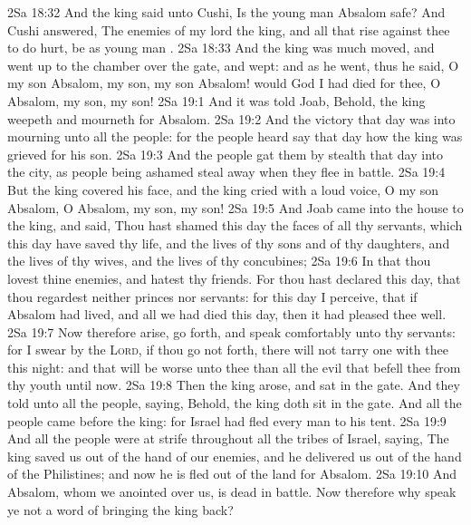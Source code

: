 \vs 2Sa 18:32 And the king said unto Cushi, Is the young man Absalom safe? And Cushi answered, The enemies of my lord the king, and all that rise against thee to do  hurt, be as  young man .
\vs 2Sa 18:33 And the king was much moved, and went up to the chamber over the gate, and wept: and as he went, thus he said, O my son Absalom, my son, my son Absalom! would God I had died for thee, O Absalom, my son, my son!
\vs 2Sa 19:1 And it was told Joab, Behold, the king weepeth and mourneth for Absalom.
\vs 2Sa 19:2 And the victory that day was  into mourning unto all the people: for the people heard say that day how the king was grieved for his son.
\vs 2Sa 19:3 And the people gat them by stealth that day into the city, as people being ashamed steal away when they flee in battle.
\vs 2Sa 19:4 But the king covered his face, and the king cried with a loud voice, O my son Absalom, O Absalom, my son, my son!
\vs 2Sa 19:5 And Joab came into the house to the king, and said, Thou hast shamed this day the faces of all thy servants, which this day have saved thy life, and the lives of thy sons and of thy daughters, and the lives of thy wives, and the lives of thy concubines;
\vs 2Sa 19:6 In that thou lovest thine enemies, and hatest thy friends. For thou hast declared this day, that thou regardest neither princes nor servants: for this day I perceive, that if Absalom had lived, and all we had died this day, then it had pleased thee well.
\vs 2Sa 19:7 Now therefore arise, go forth, and speak comfortably unto thy servants: for I swear by the \textsc{Lord}, if thou go not forth, there will not tarry one with thee this night: and that will be worse unto thee than all the evil that befell thee from thy youth until now.
\vs 2Sa 19:8 Then the king arose, and sat in the gate. And they told unto all the people, saying, Behold, the king doth sit in the gate. And all the people came before the king: for Israel had fled every man to his tent.
\vs 2Sa 19:9 And all the people were at strife throughout all the tribes of Israel, saying, The king saved us out of the hand of our enemies, and he delivered us out of the hand of the Philistines; and now he is fled out of the land for Absalom.
\vs 2Sa 19:10 And Absalom, whom we anointed over us, is dead in battle. Now therefore why speak ye not a word of bringing the king back?
